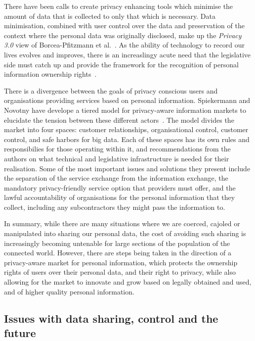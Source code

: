 \documentclass{IOS-Book-Article}     %
\begin{document}
There have been calls to create privacy enhancing tools which minimise the
amount of data that is collected to only that which is necessary. Data
minimisation, combined with user control over the data and preservation of the
context where the personal data was originally disclosed, make up the
\emph{Privacy 3.0} view of Borcea-Pfitzmann et al.~\cite{Borcea2011privacy}.     
As the ability of technology to record our lives evolves and improves, there is
an increaslingy acute need that the legislative side must catch up and provide
the framework for the recognition of personal information ownership rights~\cite{Schwartz2004property}.

There is a divergence between the goals of privacy conscious users and
organisations providing services based on personal information.
Spiekermann and Novotny have develope a tiered model for privacy-aware
information markets to elucidate the tension between these different
actors~\cite{Spiekermann2014}.
The model divides the market into four spaces: 
customer relationships, organisational control, customer control,
and safe harbors for big data. Each of these spaces has its own rules and
responsibilies for those operating within it, 
and recommendations from the authors on what technical and legislative
infrastructure is needed for their realisation.
Some of the most important issues and solutions they
present include the separation of the service exchange from the information
exchange, the mandatory privacy-friendly service option that providers must
offer, and the lawful accountability of organisations for the personal
information that they collect, including any subcontractors they might pass the
information to.                  

In summary, while there are many situations where we are coerced, cajoled or
manipulated into sharing our personal data, the cost of avoiding such
sharing is increasingly becoming untenable for large sections of the population
of the connected world. However, there are steps being taken in the direction of
a privacy-aware market for personal information, which protects the ownership
rights of users over their personal data, and their right to privacy, while also
allowing for the market to innovate and grow based on legally obtained and used,
and of higher quality personal information.    

\subsection{Issues with data sharing, control and the future}
\end{document}
